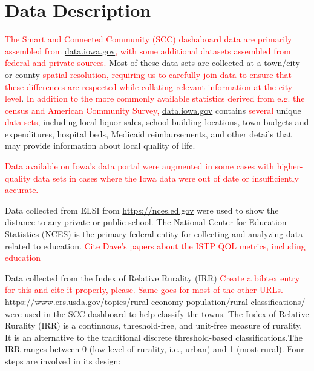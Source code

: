 \documentclass[letterpaper,inpress]{jdsart}
\begin{document}
\section{Data Description}

{\textcolor{red}{The Smart and Connected Community (SCC) dashaboard data are primarily assembled from  \url{data.iowa.gov}, with some additional datasets assembled from federal and private sources.}} Most of these data sets are collected at a town/city or county {\textcolor{red}{spatial resolution, requiring us to carefully join data to ensure that these differences are respected while collating relevant information at the city level}}. {\textcolor{red}{In addition to the more commonly available statistics derived from e.g. the census and American Community Survey,}} \url{data.iowa.gov} contains {\textcolor{red}{several}} unique {\textcolor{red}{data sets}}, including local liquor sales, school building locations, town budgets and expenditures, hospital beds, Medicaid reimbursements, and other details that may provide information about local quality of life.

{\textcolor{red}{Data available on Iowa's data portal were augmented in some cases with higher-quality data sets in cases where the Iowa data were out of date or insufficiently accurate.}}

Data collected from ELSI from \url{https://nces.ed.gov} were used to show the distance to any private or public school. The National Center for Education Statistics (NCES) is the primary federal entity for collecting and analyzing data related to education.
{\textcolor{red}{Cite Dave's papers about the ISTP QOL metrics, including education}}

Data collected from the Index of Relative Rurality (IRR) {\textcolor{red}{Create a bibtex entry for this and cite it properly, please. Same goes for most of the other URLs.}} \url{https://www.ers.usda.gov/topics/rural-economy-population/rural-classifications/} were used in the SCC dashboard to help classify the towns. The Index of Relative Rurality (IRR) is a continuous, threshold-free, and unit-free measure of rurality. It is an alternative to the traditional discrete threshold-based classifications.The IRR ranges between 0 (low level of rurality, i.e., urban) and 1 (most rural). Four steps are involved in its design:
\end{document}
